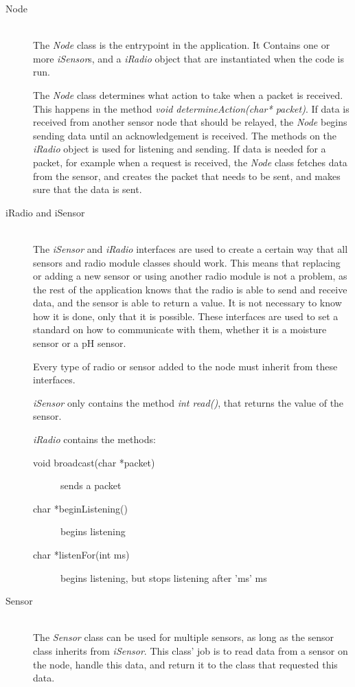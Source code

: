 \begin{description}
\item[Node] \hfill \\
The \textit{Node} class is the entrypoint in the application.
It Contains one or more \textit{iSensor}s, and a \textit{iRadio} object that are instantiated when the code is run.

The \textit{Node} class determines what action to take when a packet is received. This happens in the method \textit{void determineAction(char* packet)}.
If data is received from another sensor node that should be relayed, the \textit{Node} begins sending data until an acknowledgement is received. The methods on the \textit{iRadio} object is used for listening and sending.
If data is needed for a packet, for example when a request is received, the \textit{Node} class fetches data from the sensor, and creates the packet that needs to be sent, and makes sure that the data is sent.

\item[iRadio and iSensor] \hfill \\
The \textit{iSensor} and \textit{iRadio} interfaces are used to create a certain way that all sensors and radio module classes should work. This means that replacing or adding a new sensor or using another radio module is not a problem, as the rest of the application knows that the radio is able to send and receive data, and the sensor is able to return a value. 
It is not necessary to know how it is done, only that it is possible. These interfaces are used to set a standard on how to communicate with them, whether it is a moisture sensor or a pH sensor.

Every type of radio or sensor added to the node must inherit from these interfaces.


\textit{iSensor} only contains the method \textit{int read()}, that returns the value of the sensor.

\textit{iRadio} contains the methods:
\begin{description}
\item[void broadcast(char *packet)] sends a packet
\item[char *beginListening()] begins listening
\item[char *listenFor(int ms)] begins listening, but stops listening after 'ms' ms
\end{description}

\item[Sensor] \hfill \\
The \textit{Sensor} class can be used for multiple sensors, as long as the sensor class inherits from \textit{iSensor}. This class' job is to read data from a sensor on the node, handle this data, and return it to the class that requested this data.


\end{description}
